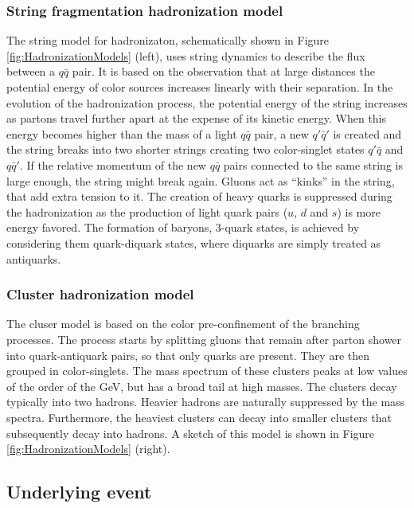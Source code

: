 \subsubsection{String fragmentation hadronization model}
    \label{subsubsec:StringModel}

The string model for hadronizaton, schematically shown in Figure \ref{fig:HadronizationModels} (left), uses string dynamics to describe the flux between a $q\bar{q}$ pair.
It is based on the observation that at large distances the potential energy of color sources increases linearly with their separation.
In the evolution of the hadronization process, the potential energy of the string increases as partons travel further apart at the expense of its kinetic energy.
When this energy becomes higher than the mass of a light $q\bar{q}$ pair, a new $q'\bar{q}'$ is created and the string breaks into two shorter strings creating two color-singlet states $q'\bar{q}$ and $q\bar{q}'$.
If the relative momentum of the new $q\bar{q}$ pairs connected to the same string is large enough, the string might break again.
Gluons act as ``kinks'' in the string, that add extra tension to it.
The creation of heavy quarks is suppressed during the hadronization as the production of light quark pairs ($u$, $d$ and $s$) is more energy favored.
The formation of baryons, 3-quark states, is achieved by considering them quark-diquark states, where diquarks are simply treated as antiquarks.


\subsubsection{Cluster hadronization model}
    \label{subsubsec:ClusterModel}

The cluser model is based on the color pre-confinement of the branching processes.
The process starts by splitting gluons that remain after parton shower into quark-antiquark pairs, so that only quarks are present.
They are then grouped in color-singlets.
The mass spectrum of these clusters peaks at low values of the order of the GeV, but has a broad tail at high masses.
The clusters decay typically into two hadrons.
Heavier hadrons are naturally suppressed by the mass spectra.
Furthermore, the heaviest clusters can decay into smaller clusters that subsequently decay into hadrons.
A sketch of this model is shown in Figure \ref{fig:HadronizationModels} (right).


\subsection{Underlying event}
    \label{subsec:UnderlyingEvent}

